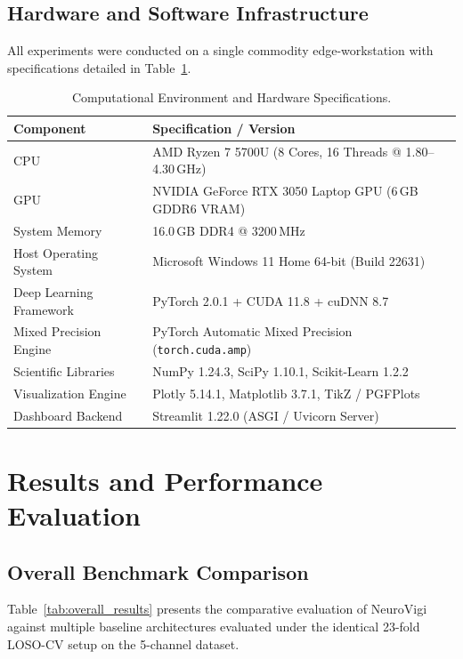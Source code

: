 \documentclass[conference]{IEEEtran}
\begin{document}
\subsection{Hardware and Software Infrastructure}
All experiments were conducted on a single commodity edge-workstation with specifications detailed in Table~\ref{tab:hardware_stack}.

\begin{table}[t]
\caption{Computational Environment and Hardware Specifications.}
\label{tab:hardware_stack}
\centering
\footnotesize
\setlength{\tabcolsep}{4.5pt}
\begin{tabular}{@{}lp{5.5cm}@{}}
\toprule
\textbf{Component} & \textbf{Specification / Version} \\
\midrule
CPU & AMD Ryzen 7 5700U (8 Cores, 16 Threads @ 1.80--4.30\,GHz) \\
GPU & NVIDIA GeForce RTX 3050 Laptop GPU (6\,GB GDDR6 VRAM) \\
System Memory & 16.0\,GB DDR4 @ 3200\,MHz \\
Host Operating System & Microsoft Windows 11 Home 64-bit (Build 22631) \\
Deep Learning Framework & PyTorch 2.0.1 + CUDA 11.8 + cuDNN 8.7 \\
Mixed Precision Engine & PyTorch Automatic Mixed Precision (\texttt{torch.cuda.amp}) \\
Scientific Libraries & NumPy 1.24.3, SciPy 1.10.1, Scikit-Learn 1.2.2 \\
Visualization Engine & Plotly 5.14.1, Matplotlib 3.7.1, TikZ / PGFPlots \\
Dashboard Backend & Streamlit 1.22.0 (ASGI / Uvicorn Server) \\
\bottomrule
\end{tabular}
\end{table}

\section{Results and Performance Evaluation}
\label{sec:results}

\subsection{Overall Benchmark Comparison}
Table~\ref{tab:overall_results} presents the comparative evaluation of NeuroVigi against multiple baseline architectures evaluated under the identical 23-fold LOSO-CV setup on the 5-channel dataset.
\end{document}
